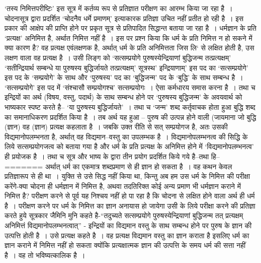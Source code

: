 ‘तस्य निमित्तपरीष्टिः' इस सूत्र में कर्तव्य रूप से प्रतिज्ञात परीक्षण का आरम्भ किया जा रहा है~। चोदनासूत्र द्वारा प्रदर्शित ‘चोदनैव धर्मे प्रमाणम्' इत्याकारक प्रतिज्ञा उचित नहीं प्रतीत हो रही है~। इस प्रकार की आक्षेप की प्राप्ति होने पर प्रकृत सूत्र से प्रतिपादित सिद्धान्त बताया जा रहा है~। धर्मज्ञान के प्रति ‘प्रत्यक्ष' अनिमित्त है, अर्थात निमित्त नहीं है~। इस पर प्रश्न किया कि धर्म के प्रति निमित्त न हो सकने में क्या कारण है? वह प्रत्यक्ष एवंलक्षणक है, अर्थात् धर्म के प्रति अनिमित्तता जिस लि‘ से लक्षित होती है, उस लक्षण वाला वह प्रत्यक्ष है~। उसी लिङ्ग को ‘सत्सम्प्रयोगे पुरुषस्येन्द्रियाणां बुद्धिजन्म तत्प्रत्यक्षम्' ‘सतीन्द्रियार्थ सम्बन्धे या पुरुषस्य बुद्धिर्जायते तत्प्रत्यक्षम्' सूत्रस्थ' इन्द्रियाणाम्' इस पद का ‘सत्सम्प्रयोगे' इस पद के ‘सम्प्रयोगे' के साथ और ‘पुरुषस्य' पद का ‘बुद्धिजन्म' पद के ‘बुद्धि' के साथ सम्बन्ध है~। ‘सत्सम्प्रयोगे' इस पद में ‘संश्चासौ सम्प्रयोगश्च' सत्सम्प्रयोगः~। ऐसा कर्मधारय समास करना है~। तथा च इन्द्रियों का अर्थ (विषय, वस्तु, पदार्थ) के साथ सम्बन्ध होने पर ‘पुरुषस्य बुद्धिजन्म' के अवयवार्थ को भाष्यकार स्पष्ट करते है– ‘या पुुरुषस्य बुद्धिर्जायते'~। तथा च ‘जन्म' शब्द कर्तृवाचक होता हुआ बुद्धि शब्द का समानाधिकरण प्रदर्शित किया है~। तब अर्थ यह हुआ – पुरुष की उत्पन्न होने वाली (जायमाना जो बुद्धि (ज्ञान) वह (ज्ञान) प्रत्यक्ष कहलाता है~। जबकि उक्त रीति से सत् सम्प्रयोगज है, अतः उसकी विद्यमानोपलम्भनता है, अर्थात् वह विद्यमान–वस्तु का उपलम्भक है~। विद्यमानोपलम्भनत्व की सिद्धि के लिये सत्सम्प्रयोगजत्व को बताया गया है और धर्म के प्रति प्रत्यक्ष के अनिमित्त होने में ‘विद्यमानोपलम्भनत्व' ही प्रयोजक है~। तथा च सूत्र और भाष्य के द्वारा तीन प्रयोग प्रदर्शित किये गये है–तथा हि–
=======
अर्थात् धर्म का एकमात्र शब्दप्रमाण से ही ज्ञान हो सकता है~। वह कथन केवल प्रतिज्ञारूप से ही था~। युक्ति से उसे सिद्ध नहीं किया था, किन्तु अब हम उस धर्म के निमित्त की परीक्षा करेंगे-क्या चोदना ही धर्मज्ञान में निमित्त है, अथवा तदतिरिक्त कोई अन्य प्रमाण भी धर्मज्ञान कराने में निमित्त है? परीक्षण करने से पूर्व यह निश्चय नहीं हो पा रहा है कि चोदना से लक्षित होने वाला अर्थ ही धर्म है~। परीक्षण करने पर धर्म के निमित्त का ज्ञान अनायास हो जायेगा उसी के लिये परीक्षा करने की प्रतिज्ञा करते हुये सूत्रकार जैमिनि मुनि कहते है-“तदुच्यते सत्सम्प्रयोगे पुरुषस्येन्द्रियाणां बुद्धिजन्म तत् प्रत्यक्षम् अनिमित्तं विद्यमानोपलम्भनत्वात्” - इन्द्रियों का विद्यमान वस्तु के साथ सम्बन्ध होने पर पुरुष के ज्ञान की उत्पत्ति होती है~। उसे प्रत्यक्ष कहते है~। वह प्रत्यक्ष विद्यमान वस्तु का ज्ञान कराता है इसलिए धर्म का ज्ञान कराने में निमित्त नहीं हो सकता क्योंकि प्रत्यक्षात्मक ज्ञान की उत्पत्ति के समय धर्म की सत्ता नहीं है~। वह तो भविष्यत्कालिक है~।

